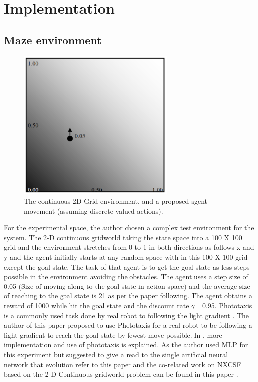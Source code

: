 \documentclass[12pt]{article}
\begin{document}
\section{Implementation}
\label{sec:1}



\subsection{Maze environment}
\label{sec:2}
\begin{figure}[!htbp]
\begin{center}
\includegraphics[width=3in]{fig_1.PNG}
\end{center}
\caption{The continuous 2D Grid environment, and a proposed agent movement (assuming discrete valued actions). \label{fig:first}}
\end{figure}
For the experimental space, the author chosen a complex test environment for the system. The 2-D continuous gridworld \cite{10.1007/978-3-540-30115-8_44} taking the state space into a 100 X 100 grid and the environment stretches from 0 to 1 in both directions as follows x and y and the agent initially starts at any random space with in this 100 X 100 grid except the goal state. The task of that agent is to get the goal state as less steps possible in the environment avoiding the obstacles. 
The agent uses a step size of 0.05 (Size of moving along to the goal state in action space) and the average size of reaching to the goal state is 21 as per the paper following\cite{111111111}. The agent obtains a reward of 1000 while hit the goal state and the discount rate $\gamma$ =0.95. Phototaxis is a commonly used task done by real robot to following the light gradient \cite{doi:10.1162/artl.2006.12.3.353}. The author of this paper proposed to use Phototaxis for a real robot to be following a light gradient to reach the goal state by fewest move possible. In \cite{doi:10.1162/artl.2006.12.3.353},\cite{10.1007/3-540-45712-7_57} more implementation and use of phototaxis is explained. As the author used MLP for this experiment but suggested to give a read to the single artificial neural network that evolution refer to this paper \cite{1554945} and the co-related work on NXCSF based on the 2-D Continuous gridworld problem can be found in this paper \cite{1554945}. 
\end{document}
